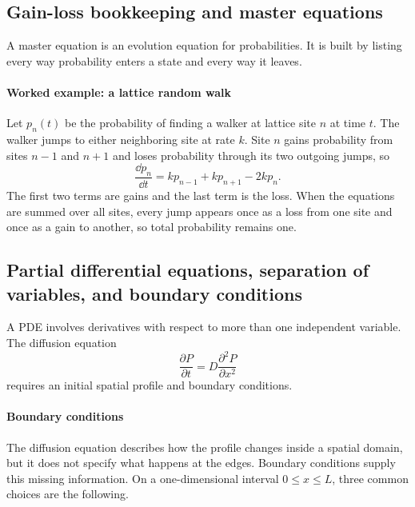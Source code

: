 \subsection{Gain-loss bookkeeping and master equations}
\label{math:master}

A master equation is an evolution equation for probabilities.
It is built by listing every way probability enters a state and every way it leaves.

\paragraph{Worked example: a lattice random walk}
Let $p_n(t)$ be the probability of finding a walker at lattice site $n$ at time $t$.
The walker jumps to either neighboring site at rate $k$.
Site $n$ gains probability from sites $n-1$ and $n+1$ and loses probability through its two outgoing jumps, so
\[
    \frac{\dd p_n}{\dd t}=kp_{n-1}+kp_{n+1}-2kp_n.
\]
The first two terms are gains and the last term is the loss.
When the equations are summed over all sites, every jump appears once as a loss from one site and once as a gain to another, so total probability remains one.


\subsection{Partial differential equations, separation of variables, and boundary conditions}
\label{math:separation}

A PDE involves derivatives with respect to more than one independent variable.
The diffusion equation
\[
    \frac{\partial P}{\partial t}=D\frac{\partial^2P}{\partial x^2}
\]
requires an initial spatial profile and boundary conditions.

\paragraph{Boundary conditions}
The diffusion equation describes how the profile changes inside a spatial domain, but it does not specify what happens at the edges.
Boundary conditions supply this missing information.
On a one-dimensional interval $0\leq x\leq L$, three common choices are the following.

